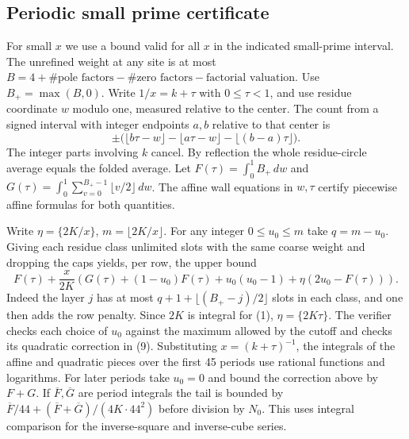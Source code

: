 \IfFileExists{TS1cmr.fd}{\documentclass[11pt]{article}}
\begin{document}
\subsection{Periodic small prime certificate}
For small \(x\) we use a bound valid for all \(x\) in the indicated
small-prime interval. The unrefined weight at any site is
at most \(B=4+\#\text{pole factors}-\#\text{zero factors}-
\text{factorial valuation}\). Use \(B_+=\max(B,0)\).
Write \(1/x=k+\tau\) with \(0\le\tau<1\), and use residue
coordinate \(w\) modulo one, measured relative to the center.
The count from a signed interval with integer endpoints \(a,b\)
relative to that center is
\[
  \pm\big(\lfloor b\tau-w\rfloor-\lfloor a\tau-w\rfloor
                         -\lfloor(b-a)\tau\rfloor\big).
 \tag{8}
\]
The integer parts involving \(k\) cancel. By reflection the
whole residue-circle average equals the folded average.
Let \(F(\tau)=\int_0^1 B_+\,dw\) and
\(G(\tau)=\int_0^1\sum_{v=0}^{B_+-1}\lfloor v/2\rfloor\,dw\).
The affine wall equations in \(w,\tau\) certify piecewise
affine formulas for both quantities.

Write \(\eta=\{2K/x\}\), \(m=\lfloor2K/x\rfloor\).
For any integer \(0\le u_0\le m\) take \(q=m-u_0\).
Giving each residue class unlimited slots with the same coarse
weight and dropping the caps yields, per row, the upper bound
\[
 F(\tau)+\frac{x}{2K}
   \left(G(\tau)+(1-u_0)F(\tau)+u_0(u_0-1)
                          +\eta(2u_0-F(\tau))\right).
 \tag{9}
\]
Indeed the layer \(j\) has at most
\(q+1+\lfloor(B_+-j)/2\rfloor\) slots in each class, and one
then adds the row penalty. Since \(2K\) is integral for (1),
\(\eta=\{2K\tau\}\). The verifier checks each choice of \(u_0\)
against the maximum allowed by the cutoff and checks its quadratic
correction in (9). Substituting \(x=(k+\tau)^{-1}\), the
integrals of the affine and quadratic pieces over the first
45 periods use rational functions and logarithms. For later
periods take \(u_0=0\) and bound the correction above by \(F+G\).
If \(\overline F,\overline G\) are period integrals the tail is
bounded by \(\overline F/44+(\overline F+\overline G)/(4K\cdot44^2)\)
before division by \(N_0\). This uses integral comparison for
the inverse-square and inverse-cube series.
\end{document}
